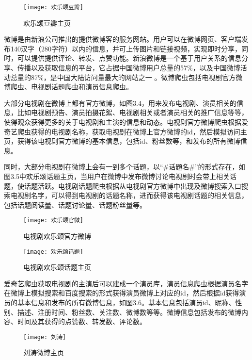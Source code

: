 \begin{figure}[H] 
  \centering
  \texttt{[image: 欢乐颂豆瓣]}
  \caption{欢乐颂豆瓣主页}
  \label{欢乐颂豆瓣}
\end{figure}

微博是由新浪公司推出的提供微博客的服务网站。用户可以在微博网页、客户端发布140汉字（280字符）以内的信息，并可上传图片和链接视频，实现即时分享，同时，可以提供提供评论、转发、点赞功能。新浪微博是一个基于用户关系的信息分享、传播以及获取信息的平台，它占据中国微博用户总量的57\%，以及中国微博活动总量的87\%，是中国大陆访问量最大的网站之一 \cite{https://zh.wikipedia.org/wiki/新浪微博}。微博爬虫包括电视剧官方微博爬虫、电视剧话题爬虫和演员信息爬虫。

大部分电视剧在微博上都有官方微博，如图3.4，用来发布电视剧、演员相关的信息，比如电视剧预告、演员拍摄花絮、电视剧相关或者演员相关的推广信息等等，使得观众获得更多的关于电视剧和主演的信息和动态。电视剧官方微博爬虫根据爱奇艺爬虫获得的电视剧名称，获取电视剧在微博上官方微博的id，然后模拟访问主页，获得该电视剧官方微博的基本信息，包括id、粉丝数等，和发布的所有微博信息。

同时，大部分电视剧在微博上会有一到多个话题，以“\#话题名\#”的形式存在，如图3.5中欢乐颂话题主页，当用户在微博中发布微博讨论电视剧时会带上相关话题，使话题活跃。电视剧话题爬虫根据从电视剧官方微博中出现及微博搜索入口搜索电视剧名字，可以得到电视剧的话题名称，进而获得该电视剧话题的相关信息，包括话题阅读量、话题讨论量、话题粉丝量等。


\begin{figure}[H] 
  \centering
  \texttt{[image: 欢乐颂官微]}
  \caption{电视剧欢乐颂官方微博}
  \label{欢乐颂官微}
\end{figure}
\begin{figure}[H] 
  \centering
  \texttt{[image: 欢乐颂话题]}
  \caption{电视剧欢乐颂话题主页}
  \label{欢乐颂话题}
\end{figure}

爱奇艺爬虫获取电视剧的主演后可以建成一个演员库，演员信息爬虫根据演员名字在微博上模拟搜索和百度搜索的形式获得演员微博上对应的id，然后根据id获得演员的基本信息和发布的所有微博信息，如图3.6。基本信息包括演员id、昵称、性别、描述、注册时间、粉丝数、关注数、微博数等等。微博信息包括发布的微博内容、时间及其获得的点赞数、转发数、评论数。

\begin{figure}[H] 
  \centering
  \texttt{[image: 刘涛]}
  \caption{刘涛微博主页}
  \label{刘涛}
\end{figure}

